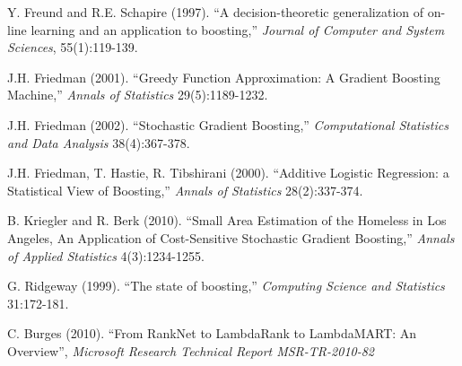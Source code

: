 \documentclass{article}
\begin{document}
\begin{thebibliography}{77}     %

\small                          %

 Y. Freund and R.E. Schapire (1997). ``A decision-theoretic generalization of on-line learning and an application to boosting,'' \textit{Journal of Computer and System Sciences}, 55(1):119-139.

 J.H. Friedman (2001). ``Greedy Function Approximation: A Gradient Boosting Machine,'' \textit{Annals of Statistics} 29(5):1189-1232.

 J.H. Friedman (2002). ``Stochastic Gradient Boosting,'' \textit{Computational Statistics and Data Analysis} 38(4):367-378.

 J.H. Friedman, T. Hastie, R. Tibshirani (2000). ``Additive Logistic Regression: a Statistical View of Boosting,'' \textit{Annals of Statistics} 28(2):337-374.
    
 B. Kriegler and R. Berk (2010). ``Small Area Estimation of the Homeless in Los Angeles, An Application of Cost-Sensitive Stochastic Gradient Boosting,'' \textit{Annals of Applied Statistics} 4(3):1234-1255.

 G. Ridgeway (1999). ``The state of boosting,'' \textit{Computing Science and Statistics} 31:172-181.

 C. Burges (2010). ``From RankNet to LambdaRank to LambdaMART: An Overview'', \textit{Microsoft Research Technical Report MSR-TR-2010-82}

\end{thebibliography}           %
\end{document}
